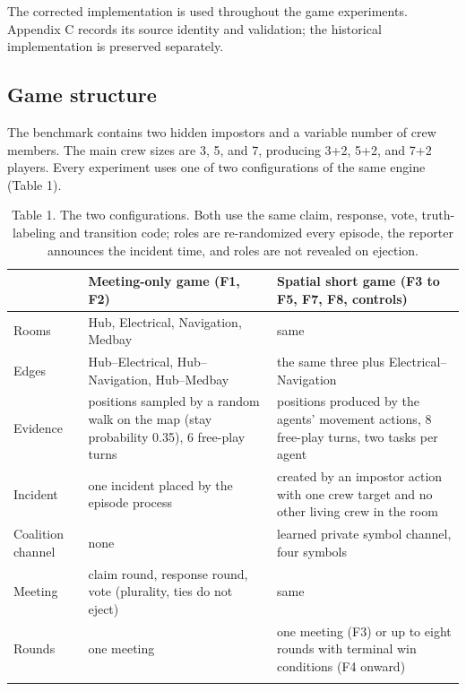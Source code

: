 \documentclass[
  12pt,
]{article}
\begin{document}
The corrected implementation is used throughout the game experiments.
Appendix C records its source identity and validation; the historical
implementation is preserved separately.

\FloatBarrier

\subsection{Game structure}\label{game-structure}

The benchmark contains two hidden impostors and a variable number of
crew members. The main crew sizes are 3, 5, and 7, producing 3+2, 5+2,
and 7+2 players. Every experiment uses one of two configurations of the
same engine (Table 1).

\FloatBarrier

\begin{table}[htbp]
\centering
\caption{Table 1. The two configurations. Both use the same claim, response,
vote, truth-labeling and transition code; roles are re-randomized every
episode, the reporter announces the incident time, and roles are not
revealed on ejection.}\label{tab:1}
\begin{tabular}{@{}
  >{\raggedright\arraybackslash}p{}
  >{\raggedright\arraybackslash}p{}
  >{\raggedright\arraybackslash}p{}@{}}
\toprule\noalign{}
\begin{minipage}[b]{\linewidth}\raggedright
\end{minipage} & \begin{minipage}[b]{\linewidth}\raggedright
Meeting-only game (F1, F2)
\end{minipage} & \begin{minipage}[b]{\linewidth}\raggedright
Spatial short game (F3 to F5, F7, F8, controls)
\end{minipage} \\
\midrule\noalign{}

Rooms & Hub, Electrical, Navigation, Medbay & same \\
Edges & Hub--Electrical, Hub--Navigation, Hub--Medbay & the same three
plus Electrical--Navigation \\
Evidence & positions sampled by a random walk on the map (stay
probability 0.35), 6 free-play turns & positions produced by the agents'
movement actions, 8 free-play turns, two tasks per agent \\
Incident & one incident placed by the episode process & created by an
impostor action with one crew target and no other living crew in the
room \\
Coalition channel & none & learned private symbol channel, four
symbols \\
Meeting & claim round, response round, vote (plurality, ties do not
eject) & same \\
Rounds & one meeting & one meeting (F3) or up to eight rounds with
terminal win conditions (F4 onward) \\
\bottomrule\noalign{}
\end{tabular}
\end{table}
\end{document}
